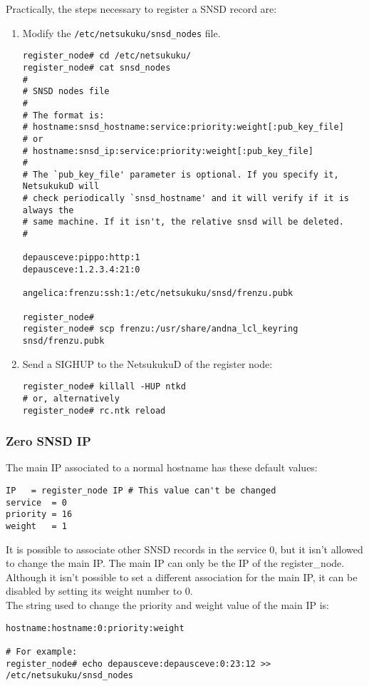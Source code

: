 \documentclass[a4paper]{article}
\begin{document}
Practically, the steps necessary to register a SNSD record are:
\begin{enumerate}
	\item Modify the \verb|/etc/netsukuku/snsd_nodes| file.
\begin{verbatim}
register_node# cd /etc/netsukuku/ 
register_node# cat snsd_nodes
#
# SNSD nodes file
#
# The format is:
# hostname:snsd_hostname:service:priority:weight[:pub_key_file]
# or
# hostname:snsd_ip:service:priority:weight[:pub_key_file]
#
# The `pub_key_file' parameter is optional. If you specify it, NetsukukuD will
# check periodically `snsd_hostname' and it will verify if it is always the
# same machine. If it isn't, the relative snsd will be deleted.
#

depausceve:pippo:http:1
depausceve:1.2.3.4:21:0

angelica:frenzu:ssh:1:/etc/netsukuku/snsd/frenzu.pubk

register_node#
register_node# scp frenzu:/usr/share/andna_lcl_keyring snsd/frenzu.pubk
\end{verbatim}
\item Send a SIGHUP to the NetsukukuD of the register node:
\begin{verbatim}
register_node# killall -HUP ntkd
# or, alternatively
register_node# rc.ntk reload
\end{verbatim}
\end{enumerate}

\subsubsection{Zero SNSD IP}

The main IP associated to a normal hostname has these default values:
\begin{verbatim}
IP	 = register_node IP	# This value can't be changed
service  = 0
priority = 16
weight   = 1
\end{verbatim}

It is possible to associate other SNSD records in the service 0, but it isn't
allowed to change the main IP. The main IP can only be the IP of the
register\_node.\\
Although it isn't possible to set a different association for the main IP, it
can be disabled by setting its weight number to 0.\\

The string used to change the priority and weight value of the main IP is:
\begin{verbatim}
hostname:hostname:0:priority:weight

# For example:
register_node# echo depausceve:depausceve:0:23:12 >> /etc/netsukuku/snsd_nodes
\end{verbatim}
\end{document}
